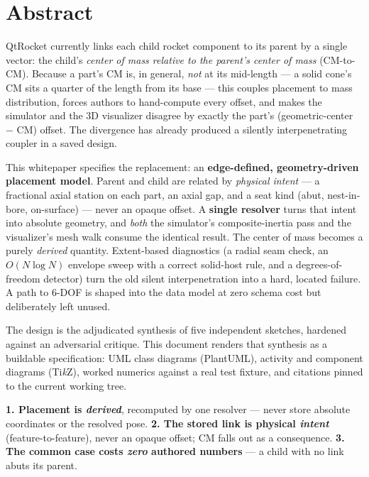 \documentclass[11pt,letterpaper]{article}
\begin{document}
\setcounter{page}{2}
\section*{Abstract}
QtRocket currently links each child rocket component to its parent by a single vector: the child's
\emph{center of mass relative to the parent's center of mass} (CM-to-CM). Because a part's CM is, in
general, \emph{not} at its mid-length --- a solid cone's CM sits a quarter of the length from its base ---
this couples placement to mass distribution, forces authors to hand-compute every offset, and makes the
simulator and the 3D visualizer disagree by exactly the part's (geometric-center $-$ CM) offset. The
divergence has already produced a silently interpenetrating coupler in a saved design.

This whitepaper specifies the replacement: an \textbf{edge-defined, geometry-driven placement model}. Parent
and child are related by \emph{physical intent} --- a fractional axial station on each part, an axial gap,
and a seat kind (abut, nest-in-bore, on-surface) --- never an opaque offset. A \textbf{single resolver}
turns that intent into absolute geometry, and \emph{both} the simulator's composite-inertia pass and the
visualizer's mesh walk consume the identical result. The center of mass becomes a purely \emph{derived}
quantity. Extent-based diagnostics (a radial seam check, an $O(N\log N)$ envelope sweep with a correct
solid-host rule, and a degrees-of-freedom detector) turn the old silent interpenetration into a hard,
located failure. A path to 6-DOF is shaped into the data model at zero schema cost but deliberately left
unused.

The design is the adjudicated synthesis of five independent sketches, hardened against an adversarial
critique. This document renders that synthesis as a buildable specification: UML class diagrams (PlantUML),
activity and component diagrams (Ti\emph{k}Z), worked numerics against a real test fixture, and citations
pinned to the current working tree.

\vspace{0.5em}
\begin{designrule}
\textbf{1. Placement is \emph{derived}}, recomputed by one resolver --- never store absolute coordinates or
the resolved pose. \textbf{2. The stored link is physical \emph{intent}} (feature-to-feature), never an
opaque offset; CM falls out as a consequence. \textbf{3. The common case costs \emph{zero} authored
numbers} --- a child with no link abuts its parent.
\end{designrule}
\end{document}

